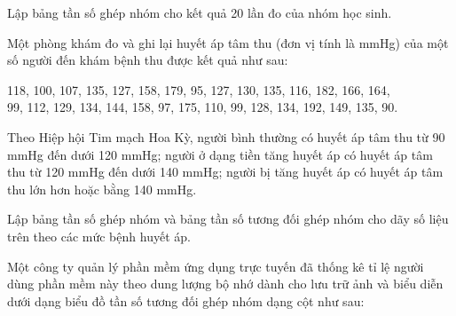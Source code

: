 \begin{practice}
\begin{questions}[resume=SBT]
\begin{questions}
            \answerline
            \answerline

            \item Lập bảng tần số ghép nhóm cho kết quả 20 lần đo của nhóm học sinh.

            \answerline
            \answerline
            \answerline
        \end{questions}

        \item Một phòng khám đo và ghi lại huyết áp tâm thu (đơn vị tính là mmHg) của một số người đến khám bệnh thu được kết quả như sau:

        \begin{center}
            118, 100, 107, 135, 127, 158, 179, 95, 127, 130, 135, 116, 182, 166, 164,\\
            99, 112, 129, 134, 144, 158, 97, 175, 110, 99, 128, 134, 192, 149, 135, 90.
        \end{center}

        Theo Hiệp hội Tim mạch Hoa Kỳ, người bình thường có huyết áp tâm thu từ 90 mmHg đến dưới 120 mmHg; người ở dạng tiền tăng huyết áp có huyết áp tâm thu từ 120 mmHg đến dưới 140 mmHg; người bị tăng huyết áp có huyết áp tâm thu lớn hơn hoặc bằng 140 mmHg.

        Lập bảng tần số ghép nhóm và bảng tần số tương đối ghép nhóm cho dãy số liệu trên theo các mức bệnh huyết áp.

        \answerline
        \answerline
        \answerline
        \answerline

        \item Một công ty quản lý phần mềm ứng dụng trực tuyến đã thống kê tỉ lệ người dùng phần mềm này theo dung lượng bộ nhớ dành cho lưu trữ ảnh và biểu diễn dưới dạng biểu đồ tần số tương đối ghép nhóm dạng cột như sau:


\end{questions}
\end{practice}
